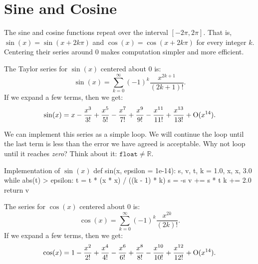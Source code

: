 \section{Sine and Cosine}\label{section:sincos}

The sine and cosine functions repeat over the interval $[-2\pi, 2\pi]$. That is,
$\sin(x)=\sin(x +2k\pi)$ and $\cos(x)=\cos(x +2k\pi)$ for every integer $k$.
Centering their series around $0$ makes computation simpler and more efficient.

The Taylor series for $\sin(x)$
centered about $0$ is:
$$
\sin(x)= \sum_{k=0}^{\infty} (-1)^k \frac{x^{2k + 1}}{(2k +1)!}.
$$
If we expand a few terms, then we get:
$$
  \sin(x) = x - \frac{x^{3}}{3!} + \frac{x^{5}}{5!} - \frac{x^{7}}{7!} + \frac{x^{9}}{9!} - \frac{x^{11}}{11!}
              + \frac{x^{13}}{13!} + \operatorname{O}(x^{14}).
$$

We can implement this series as a simple loop. We will continue the loop until
the last term is less than the error we have agreed is acceptable. Why not loop
until it reaches \emph{zero}? Think about it: $\texttt{float} \ne {\mathbb R}$.

\begin{pylisting}{Implementation of $\sin(x)$}
def sin(x, epsilon = 1e-14):
    s, v, t, k = 1.0, x, x, 3.0
    while abs(t) > epsilon:
        t = t * (x * x) / ((k - 1) * k)
        s = -s
        v += s * t
        k += 2.0
    return v
\end{pylisting}

The series for $\cos(x)$ centered about $0$ is:
$$
\cos(x)= \sum_{k=0}^{\infty} (-1)^k \frac{x^{2k}}{(2k)!} .
$$
If we expand a few terms, then we get:
$$
  \cos(x) = 1 - \frac{x^{2}}{2!} + \frac{x^{4}}{4!} - \frac{x^{6}}{6!} + \frac{x^{8}}{8!} - \frac{x^{10}}{10!}
              + \frac{x^{12}}{12!} + \operatorname{O}(x^{14}).
$$
